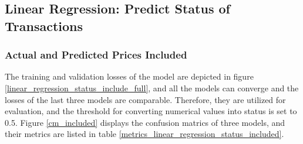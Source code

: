 \documentclass[12pt,twoside]{report}
\begin{document}
\subsection{Linear Regression: Predict Status of Transactions}
\label{linear_regression_status}
\subsubsection{Actual and Predicted Prices Included}
The training and validation losses of the model are depicted in figure \ref{linear_regression_status_include_full}, and all the models can converge and the losses of the last three models are comparable. Therefore, they are utilized for evaluation, and the threshold for converting numerical values into status is set to 0.5. Figure \ref{cm_included} displays the confusion matrics of three models, and their metrics are listed in table \ref{metrics_linear_regression_status_included}.
\\
\end{document}
